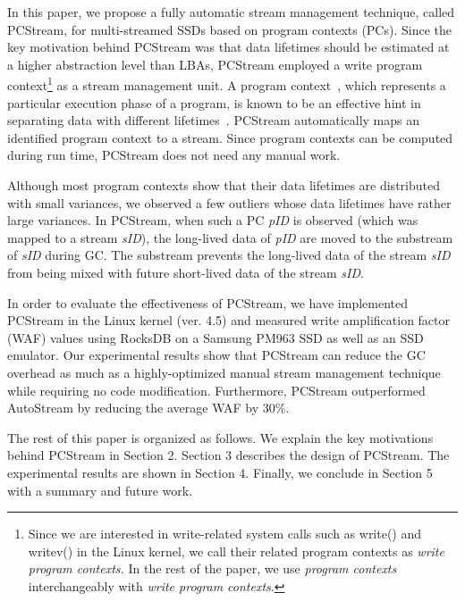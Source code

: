 In this paper, we propose a fully automatic stream management technique, called {\sf PCStream}, 
for multi-streamed SSDs based on program contexts (PCs).
Since the key motivation behind {\sf PCStream} was 
that data lifetimes should be estimated at a higher abstraction level than LBAs, 
{\sf PCStream} employed a write program context\footnote{Since we are interested in write-related 
system calls such as write() and writev() in the Linux kernel, 
we call their related program contexts as 
{\it write program contexts.} In the rest of the paper, we use 
{\it program contexts} interchangeably with {\it write program contexts}.}  
as a stream management unit.
A program context~\cite{PC, PC2}, which represents a particular execution phase of a program, 
is known to be an effective hint in separating data with different lifetimes~\cite{PCHa}.  
{\sf PCStream} automatically maps an identified program context to a stream.  
Since program contexts can be computed during run time, 
{\sf PCStream} does not need any manual work.   

Although most program contexts show that their data lifetimes are 
distributed with small variances, we observed a few outliers 
whose data lifetimes have rather large variances.
In {\sf PCStream}, 
when such a PC {\it pID} is observed (which was mapped to a stream {\it sID}), 
the long-lived data of {\it pID} are moved to the substream of {\it sID}
during GC.  
The substream prevents the long-lived data of the stream {\it sID} 
from being mixed with future short-lived data of the stream {\it sID}.

In order to evaluate the effectiveness of {\sf PCStream}, 
we have implemented {\sf PCStream}
in the Linux kernel (ver. 4.5) and measured write amplification factor (WAF) values 
using RocksDB on a Samsung PM963 SSD 
as well as an SSD emulator.
Our experimental results show that {\sf PCStream}
can reduce the GC overhead as much as a highly-optimized 
manual stream management technique while requiring no code modification.  
Furthermore, PCStream outperformed AutoStream by reducing the average WAF by 30\%.

The rest of this paper is organized as follows. 
We explain the key motivations behind {\sf PCStream} in Section 2. 
Section 3 describes 
the design of {\sf PCStream}.
The experimental results are shown in Section 4. 
Finally, we conclude in Section 5 with a summary and future work. 

